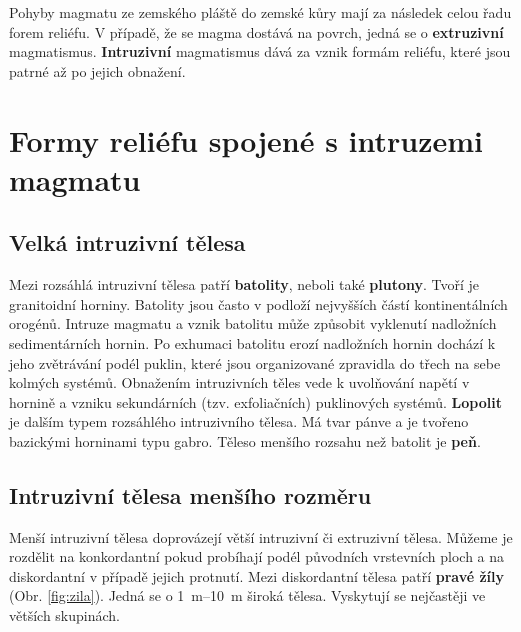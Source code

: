 Pohyby magmatu ze zemského pláště do zemské kůry mají za následek celou řadu forem reliéfu. V případě, že se magma dostává na povrch, jedná se o \textbf{extruzivní} magmatismus.  \textbf{Intruzivní} magmatismus dává za vznik formám reliéfu, které jsou patrné až po jejich obnažení.

\section{Formy reliéfu spojené s intruzemi magmatu}
\subsection{Velká intruzivní tělesa}
Mezi rozsáhlá intruzivní tělesa patří \textbf{batolity}, neboli také \textbf{plutony}. Tvoří je granitoidní horniny. Batolity jsou často v podloží nejvyšších částí kontinentálních orogénů. Intruze magmatu a vznik batolitu může způsobit vyklenutí nadložních sedimentárních hornin. Po exhumaci batolitu erozí nadložních hornin dochází k jeho zvětrávání podél puklin, které jsou organizované zpravidla do třech na sebe kolmých systémů. Obnažením intruzivních těles vede k uvolňování napětí v hornině a vzniku sekundárních (tzv. exfoliačních) puklinových systémů. \textbf{Lopolit} je dalším typem rozsáhlého intruzivního tělesa. Má tvar pánve a je tvořeno bazickými horninami typu gabro. Těleso menšího rozsahu než batolit je \textbf{peň}.

\subsection{Intruzivní tělesa menšího rozměru}
Menší intruzivní tělesa doprovázejí větší intruzivní či extruzivní tělesa. Můžeme je rozdělit na konkordantní pokud probíhají podél původních vrstevních ploch a na diskordantní v případě jejich protnutí. Mezi diskordantní tělesa patří \textbf{pravé žíly} (Obr. \ref{fig:zila}). Jedná se o \SIrange{1}{10}{\metre} široká tělesa. Vyskytují se nejčastěji ve větších skupinách.

